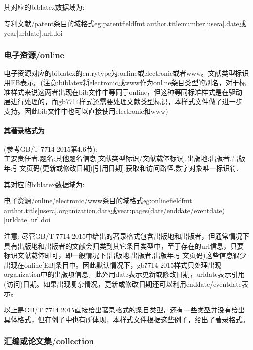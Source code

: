 其对应的biblatex数据域为:
\begin{codetex}{专利文献/patent条目的域格式}{eg:patentfieldfmt}
author.title:number[usera].date或year[urldate].url.doi
\end{codetex}

\subsubsection{电子资源/online}
\begin{refentry}{}{}%
电子资源对应的biblatex的entrytype为:online或electronic或者www。文献类型标识用EB表示。(注意:biblatex将electronic或www作为online条目类型的别名，对于标准样式来说这两者出现在bib文件中等同于online，但这种等同标准样式是在驱动层进行处理的，而gb7714样式还需要处理文献类型标识，本样式文件做了进一步支持。因此bib文件中也可以直接使用electronic和www)

\paragraph{其著录格式为}(参考GB/T 7714-2015第4.6节):\\
主要责任者.题名:其他题名信息[文献类型标识/文献载体标识].出版地:出版者,出版年:引文页码(更新或修改日期)[引用日期].获取和访问路径.数字对象唯一标识符.
\end{refentry}

其对应的biblatex数据域为:
\begin{codetex}{电子资源/online/electronic/www条目的域格式}{eg:onlinefieldfmt}
author.title[usera].organization,date或year:pages(date/enddate/eventdate)[urldate].url.doi
\end{codetex}

注意: 尽管GB/T 7714-2015中给出的著录格式包含出版地和出版者，但通常情况下具有出版地和出版者的文献会归类到其它条目类型中，至于存在的url信息，只要标识文献载体即可，即一般情况下(出版地:出版者,出版年:引文页码)这些信息很少出现在online[EB]条目中。因此默认情况下，gb7714-2015样式只处理出现organization中的出版项信息，此外用date表示更新或修改日期，urldate表示引用(访问)日期。如果出现复杂情况，更新或修改日期还可以利用enddate/eventdate表示。

以上是GB/T 7714-2015直接给出著录格式的条目类型，还有一些类型并没有给出具体格式，但在例子中也有所体现，本样式文件根据这些例子，给出了著录格式。

\subsubsection{汇编或论文集/collection}

